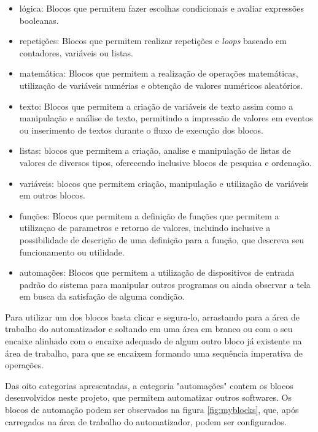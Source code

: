 \documentclass[tg]{mdtufsm}
\begin{document}
                \begin{itemize}
                    \item lógica: Blocos que permitem fazer escolhas condicionais e avaliar expressões booleanas.
                    \item repetições: Blocos que permitem realizar repetições e \emph{loops} baseado em contadores, variáveis ou listas.
                    \item matemática: Blocos que permitem a realização de operações matemáticas, utilização de variáveis numérias e obtenção de valores numéricos aleatórios.
                    \item texto: Blocos que permitem a criação de variáveis de texto assim como a manipulação e análise de texto, permitindo a impressão de valores em eventos ou inserimento de textos durante o fluxo de execução dos blocos.
                    \item listas: blocos que permitem a criação, analise e manipulação de listas de valores de diversos tipos, oferecendo inclusive blocos de pesquisa e ordenação.
                    \item variáveis: blocos que permitem criação, manipulação e utilização de variáveis em outros blocos.
                    \item funções: Blocos que permitem a definição de funções que permitem a utilizaçao de parametros e retorno de valores, incluindo inclusive a possibilidade de descrição de uma definição para a função, que descreva seu funcionamento ou utilidade.
                    \item automações: Blocos que permitem a utilização de dispositivos de entrada padrão do sistema para manipular outros programas ou ainda observar a tela em busca da satisfação de alguma condição.
                \end{itemize}

                Para utilizar um dos blocos basta clicar e segura-lo, arrastando para a área de trabalho do automatizador e soltando em uma área em branco ou com o seu encaixe alinhado com o encaixe adequado de algum outro bloco já existente na área de trabalho, para que se encaixem formando uma sequência imperativa de operações.

                Das oito categorias apresentadas, a categoria "automações" contem os blocos desenvolvidos neste projeto, que permitem automatizar outros softwares. Os blocos de automação podem ser observados na figura \ref{fig:myblocks}, que, após carregados na área de trabalho do automatizador, podem ser configurados.
\end{document}
